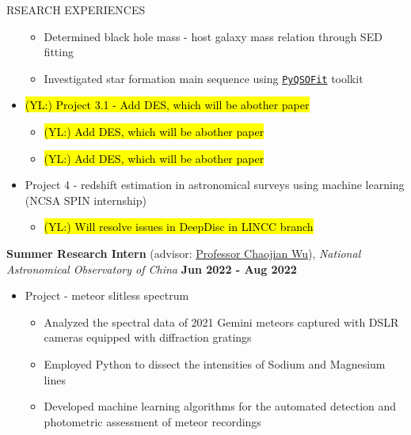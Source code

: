 \documentclass[10pt]{article} %
\DeclareRobustCommand{\yichen}[1]{{\sethlcolor{lime}\hl{(YL:) #1}}}
\begin{document}
\begin{section}{RSEARCH EXPERIENCES}
\begin{itemize}[leftmargin=1.5em]
\begin{itemize}[leftmargin=1.5em]
        \item Determined black hole mass - host galaxy mass relation through SED fitting
        \item Investigated star formation main sequence using \href{https://github.com/legolason/PyQSOFit}{\texttt{PyQSOFit}} toolkit
    \end{itemize}
    \item \yichen{Project 3.1 - Add DES, which will be abother paper}
    \begin{itemize}[leftmargin=1.5em]
        \item \yichen{Add DES, which will be abother paper}
        \item \yichen{Add DES, which will be abother paper}
    \end{itemize}
    \item Project 4 - redshift estimation in astronomical surveys using machine learning (NCSA SPIN internship)
    \begin{itemize}[leftmargin=1.5em]
        \item \yichen{Will resolve issues in DeepDisc in LINCC branch}
    \end{itemize}
\end{itemize}

\textbf{Summer Research Intern} (advisor: \href{mailto:chjwu@bao.ac.cn}{Professor Chaojian Wu}), \textit{National Astronomical Observatory of China} \hfill \textbf{Jun 2022 - Aug 2022} 
\begin{itemize}[leftmargin=1.5em]
    \item Project - meteor slitless spectrum
    \begin{itemize}[leftmargin=1.5em]
        \item Analyzed the spectral data of 2021 Gemini meteors captured with DSLR cameras equipped with diffraction gratings
        \item Employed Python to dissect the intensities of Sodium and Magnesium lines 
        \item Developed machine learning algorithms for the automated detection and photometric assessment of meteor recordings
    \end{itemize}
\end{itemize}


\end{section}
\end{document}
